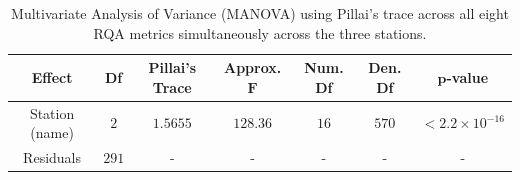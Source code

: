 \vspace{-3pt}
\begin{table}[H]
\caption{Multivariate Analysis of Variance (MANOVA) using Pillai's trace across all eight RQA metrics simultaneously across the three stations.\label{tab:manova_fit}}
\begin{tabularx}{\textwidth}{CCCCCCC}
\toprule
\textbf{Effect} & \textbf{Df} & \textbf{Pillai's Trace} & \textbf{Approx.} $\boldsymbol{F}$ & \textbf{Num. Df} & \textbf{Den. Df} & $\boldsymbol{p}$\textbf{-value} \\
\midrule
Station (name) & $2$ & $1.5655$ & $128.36$ & $16$ & $570$ & $< 2.2 \times 10^{-16}$ \\
Residuals & $291$ & - & - & - & - & - \\
\bottomrule
\end{tabularx}
\end{table}
\vspace{-3pt}
